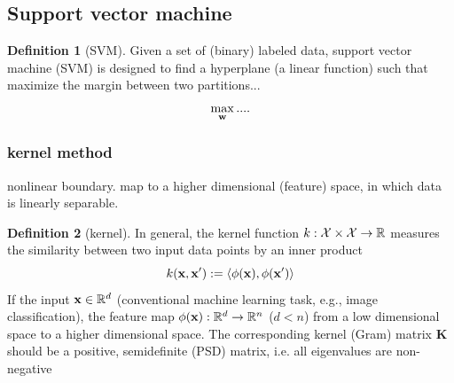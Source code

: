 \documentclass[
10pt,
aps,
pra,
linenumbers,
floatfix,
]{revtex4-2}
\theoremstyle{plain}
\theoremstyle{definition}
\newtheorem{definition}{Definition}
\newcommand{\kernel}{k}
\begin{document}
\subsection{Support vector machine}\label{sec:svm}
\begin{definition}[SVM]\label{def:svm}
	Given a set of (binary) labeled data,
	support vector machine (SVM) is designed to
	find a hyperplane (a linear function) such that maximize the margin between two partitions...
	\begin{equation}
		\max_{\vb{w}} 
		....
	\end{equation}
\end{definition}

\subsubsection{kernel method}
nonlinear boundary. map to a higher dimensional (feature) space, in which data is linearly separable.
\begin{definition}[kernel]\label{def:kernel}
	In general, the kernel function $\kernel:\mathcal{X}\times \mathcal{X} \to \realnumber$ measures the similarity between two input data points by an inner product
	\begin{equation}
		\kernel (\vbx,\vbx') : = \expval{\phi(\vbx),\phi(\vbx')}
	\end{equation}
	If the input $\vb{x}\in \mathbb{R}^d$ (conventional machine learning task, e.g., image classification), the feature map $\phi(\vb{x}): \mathbb{R}^d\to \mathbb{R}^n$ ($d < n$) from a low dimensional space to a higher dimensional space.
	The corresponding kernel (Gram) matrix $\mathbf{K}$ should be a positive, semidefinite (PSD) matrix, i.e. all eigenvalues are non-negative
\end{definition}
\end{document}
